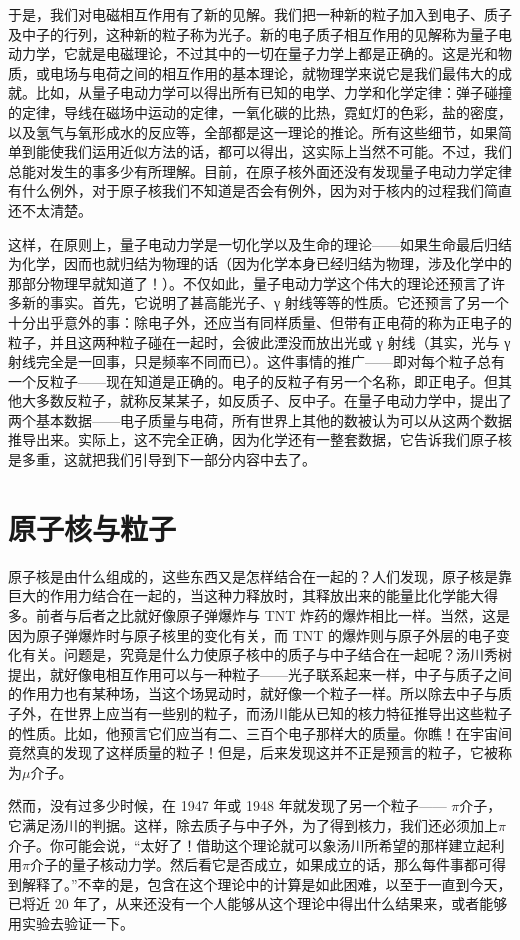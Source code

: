 \documentclass[12pt,oneside]{book}
\begin{document}
\begin{common-format}
于是，我们对电磁相互作用有了新的见解。我们把一种新的粒子加入到电子、质子及中子的行列，这种新的粒子称为光子。新的电子质子相互作用的见解称为量子电动力学，它就是电磁理论，不过其中的一切在量子力学上都是正确的。这是光和物质，或电场与电荷之间的相互作用的基本理论，就物理学来说它是我们最伟大的成就。比如，从量子电动力学可以得出所有已知的电学、力学和化学定律：弹子碰撞的定律，导线在磁场中运动的定律，一氧化碳的比热，霓虹灯的色彩，盐的密度，以及氢气与氧形成水的反应等，全部都是这一理论的推论。所有这些细节，如果简单到能使我们运用近似方法的话，都可以得出，这实际上当然不可能。不过，我们总能对发生的事多少有所理解。目前，在原子核外面还没有发现量子电动力学定律有什么例外，对于原子核我们不知道是否会有例外，因为对于核内的过程我们简直还不太清楚。

这样，在原则上，量子电动力学是一切化学以及生命的理论——如果生命最后归结为化学，因而也就归结为物理的话（因为化学本身已经归结为物理，涉及化学中的那部分物理早就知道了！）。不仅如此，量子电动力学这个伟大的理论还预言了许多新的事实。首先，它说明了甚高能光子、γ 射线等等的性质。它还预言了另一个十分出乎意外的事：除电子外，还应当有同样质量、但带有正电荷的称为正电子的粒子，并且这两种粒子碰在一起时，会彼此湮没而放出光或 γ 射线（其实，光与 γ 射线完全是一回事，只是频率不同而已）。这件事情的推广——即对每个粒子总有一个反粒子——现在知道是正确的。电子的反粒子有另一个名称，即正电子。但其他大多数反粒子，就称反某某子，如反质子、反中子。在量子电动力学中，提出了两个基本数据——电子质量与电荷，所有世界上其他的数被认为可以从这两个数据推导出来。实际上，这不完全正确，因为化学还有一整套数据，它告诉我们原子核是多重，这就把我们引导到下一部分内容中去了。


\section{原子核与粒子}
原子核是由什么组成的，这些东西又是怎样结合在一起的？人们发现，原子核是靠巨大的作用力结合在一起的，当这种力释放时，其释放出来的能量比化学能大得多。前者与后者之比就好像原子弹爆炸与 TNT 炸药的爆炸相比一样。当然，这是因为原子弹爆炸时与原子核里的变化有关，而 TNT 的爆炸则与原子外层的电子变化有关。问题是，究竟是什么力使原子核中的质子与中子结合在一起呢？汤川秀树提出，就好像电相互作用可以与一种粒子——光子联系起来一样，中子与质子之间的作用力也有某种场，当这个场晃动时，就好像一个粒子一样。所以除去中子与质子外，在世界上应当有一些别的粒子，而汤川能从已知的核力特征推导出这些粒子的性质。比如，他预言它们应当有二、三百个电子那样大的质量。你瞧！在宇宙间竟然真的发现了这样质量的粒子！但是，后来发现这并不正是预言的粒子，它被称为$\mu$介子。

然而，没有过多少时候，在 1947 年或 1948 年就发现了另一个粒子—— $\pi$介子，它满足汤川的判据。这样，除去质子与中子外，为了得到核力，我们还必须加上$\pi$介子。你可能会说，“太好了！借助这个理论就可以象汤川所希望的那样建立起利用$\pi$介子的量子核动力学。然后看它是否成立，如果成立的话，那么每件事都可得到解释了。”不幸的是，包含在这个理论中的计算是如此困难，以至于一直到今天，已将近 20 年了，从来还没有一个人能够从这个理论中得出什么结果来，或者能够用实验去验证一下。


\end{common-format}
\end{document}
